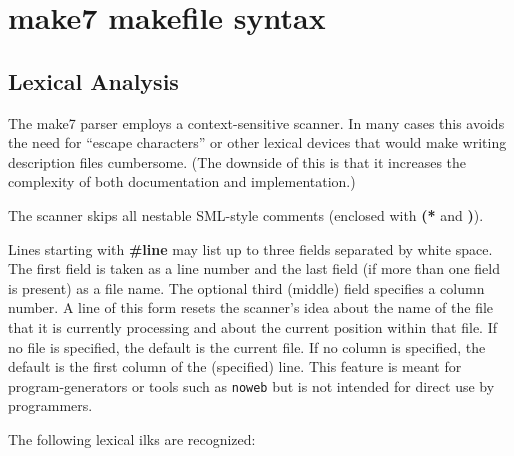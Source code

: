 
\section{make7 makefile syntax}

\subsection{Lexical Analysis}

The make7 parser employs a context-sensitive scanner.  In many cases this
avoids the need for ``escape characters'' or other lexical devices
that would make writing description files cumbersome.  (The downside
of this is that it increases the complexity of both documentation and
implementation.)

The scanner skips all nestable SML-style comments (enclosed with {\bf
(*} and {\bf *)}).

Lines starting with {\bf \#line} may list up to three fields separated
by white space.  The first field is taken as a line number and the
last field (if more than one field is present) as a file name.  The
optional third (middle) field specifies a column number.  A line of
this form resets the scanner's idea about the name of the file that it
is currently processing and about the current position within that
file.  If no file is specified, the default is the current file.  If
no column is specified, the default is the first column of the
(specified) line.  This feature is meant for program-generators or
tools such as {\tt noweb} but is not intended for direct use by
programmers.

The following lexical ilks are recognized:

